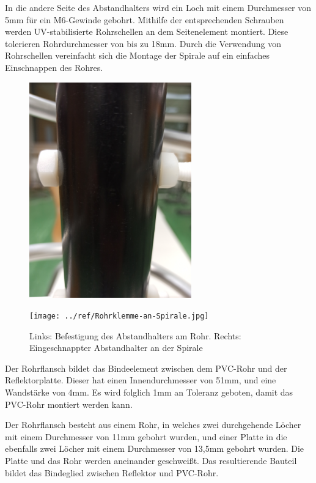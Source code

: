 In die andere Seite des Abstandhalters wird ein Loch mit einem Durchmesser von 5mm für ein M6-Gewinde gebohrt. Mithilfe der entsprechenden Schrauben werden UV-stabilisierte Rohrschellen an dem Seitenelement montiert. Diese tolerieren Rohrdurchmesser von bis zu 18mm. Durch die Verwendung von Rohrschellen vereinfacht sich die Montage der Spirale auf ein einfaches Einschnappen des Rohres.

\begin{figure}[H]
	\begin{minipage}[b]{.4\linewidth} %
		\includegraphics[width=7cm, angle=270]{../ref/Befestigung-Querelement.jpg}
		\label{fig:Abstandhalter-Befestigung}
	\end{minipage}
	\hspace{.1\linewidth}%
	\begin{minipage}[b]{.4\linewidth} %
		\texttt{[image: ../ref/Rohrklemme-an-Spirale.jpg]}
		\label{fig:Seitenelement-an-Spirale}
	\end{minipage}
	\caption{Links: Befestigung des Abstandhalters am Rohr. Rechts: Eingeschnappter Abstandhalter an der Spirale}
\end{figure}

Der Rohrflansch bildet das Bindeelement zwischen dem PVC-Rohr und der Reflektorplatte. Dieser hat einen Innendurchmesser von 51mm, und eine Wandstärke von 4mm. Es wird folglich 1mm an Toleranz geboten, damit das PVC-Rohr montiert werden kann. 

Der Rohrflansch besteht aus einem Rohr, in welches zwei durchgehende Löcher mit einem Durchmesser von 11mm gebohrt wurden, und einer Platte in die ebenfalls zwei Löcher mit einem Durchmesser von 13,5mm gebohrt wurden. Die Platte und das Rohr werden aneinander geschweißt. Das resultierende Bauteil bildet das Bindeglied zwischen Reflektor und PVC-Rohr.

